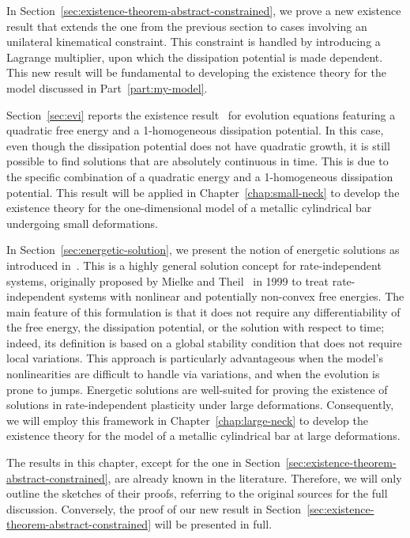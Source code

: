 \documentclass[a4paper,10pt,oneside]{amsbook}
\numberwithin{section}{chapter}
\numberwithin{equation}{chapter}
\theoremstyle{definition}
\begin{document}
In Section~\ref{sec:existence-theorem-abstract-constrained}, we prove a new existence result that extends the one from the previous section to cases involving an unilateral kinematical constraint. This constraint is handled by introducing a Lagrange multiplier, upon which the dissipation potential is made dependent. This new result will be fundamental to developing the existence theory for the model discussed in Part~\ref{part:my-model}.

Section~\ref{sec:evi} reports the existence result~\cite[Theorem 7.3]{han-reddy} for evolution equations featuring a quadratic free energy and a 1-homogeneous dissipation potential. In this case, even though the dissipation potential does not have quadratic growth, it is still possible to find solutions that are absolutely continuous in time. This is due to the specific combination of a quadratic energy and a 1-homogeneous dissipation potential. This result will be applied in Chapter~\ref{chap:small-neck} to develop the existence theory for the one-dimensional model of a metallic cylindrical bar undergoing small deformations.

In Section~\ref{sec:energetic-solution}, we present the notion of energetic solutions as introduced in~\cite{francfort,rate-independent-systems}. This is a highly general solution concept for rate-independent systems, originally proposed by Mielke and Theil~\cite{mielke1999mathematical} in 1999 to treat rate-independent systems with nonlinear and potentially non-convex free energies. The main feature of this formulation is that it does not require any differentiability of the free energy, the dissipation potential, or the solution with respect to time; indeed, its definition is based on a global stability condition that does not require local variations. This approach is particularly advantageous when the model's nonlinearities are difficult to handle via variations, and when the evolution is prone to jumps. Energetic solutions are well-suited for proving the existence of solutions in rate-independent plasticity under large deformations. Consequently, we will employ this framework in Chapter~\ref{chap:large-neck} to develop the existence theory for the model of a metallic cylindrical bar at large deformations.

The results in this chapter, except for the one in Section~\ref{sec:existence-theorem-abstract-constrained}, are already known in the literature. Therefore, we will only outline the sketches of their proofs, referring to the original sources for the full discussion. Conversely, the proof of our new result in Section~\ref{sec:existence-theorem-abstract-constrained} will be presented in full.
\end{document}
